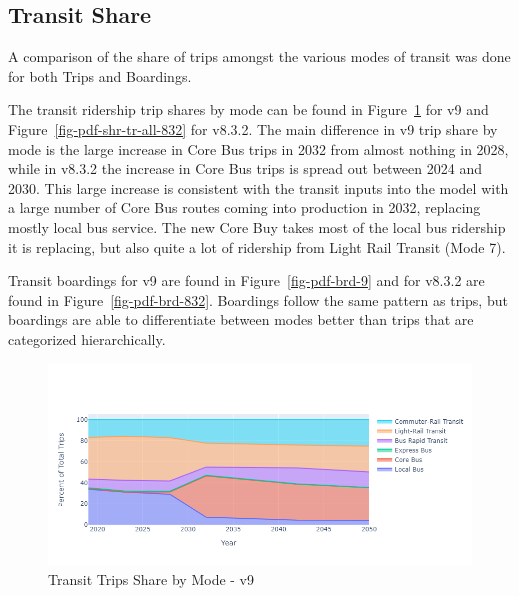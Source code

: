 \documentclass[
  letterpaper,
  DIV=11,
  numbers=noendperiod,
  titlepage=false]{scrreprt}
\begin{document}
\hypertarget{transit-share}{%
\subsection{Transit Share}\label{transit-share}}

A comparison of the share of trips amongst the various modes of transit
was done for both Trips and Boardings.

The transit ridership trip shares by mode can be found in
Figure~\ref{fig-pdf-shr-tr-all-9} for v9 and
Figure~\ref{fig-pdf-shr-tr-all-832} for v8.3.2. The main difference in
v9 trip share by mode is the large increase in Core Bus trips in 2032
from almost nothing in 2028, while in v8.3.2 the increase in Core Bus
trips is spread out between 2024 and 2030. This large increase is
consistent with the transit inputs into the model with a large number of
Core Bus routes coming into production in 2032, replacing mostly local
bus service. The new Core Buy takes most of the local bus ridership it
is replacing, but also quite a lot of ridership from Light Rail Transit
(Mode 7).

Transit boardings for v9 are found in Figure~\ref{fig-pdf-brd-9} and for
v8.3.2 are found in Figure~\ref{fig-pdf-brd-832}. Boardings follow the
same pattern as trips, but boardings are able to differentiate between
modes better than trips that are categorized hierarchically.

\begin{figure}[H]

{\centering \includegraphics{v9x/v900/whats-new/_pictures/pdf-shr-tr-all-9.png}

}

\caption{\label{fig-pdf-shr-tr-all-9}Transit Trips Share by Mode - v9}

\end{figure}
\end{document}
